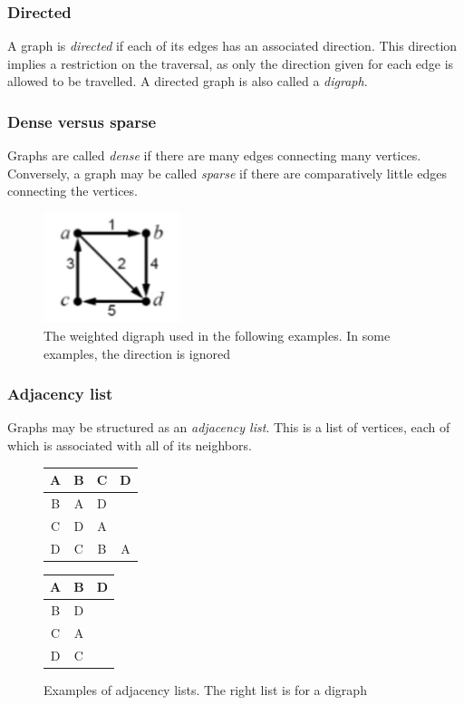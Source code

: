 \documentclass{article}
\begin{document}
{\subsubsection{Directed}
A graph is {\em directed} if each of its edges has an associated direction. This direction implies a restriction
on the traversal, as only the direction given for each edge is allowed to be travelled. A directed graph is also
called a {\em digraph}.

\subsubsection{Dense versus sparse}
Graphs are called {\em dense} if there are many edges connecting many vertices.
Conversely, a graph may be called {\em sparse} if there are comparatively little edges connecting the vertices.

\begin{figure}[H]
  \centering
  \includegraphics[width=4cm]{weighted_directed_graph}
  \caption{The weighted digraph used in the following examples. In some examples, the direction is ignored}
\end{figure}

\subsubsection{Adjacency list}
Graphs may be structured as an {\em adjacency list}. This is a list of vertices, each of which is associated with
all of its neighbors.

\begin{figure}[H]
  \centering
  \begin{tabular}{|c|c c c|}
    \hline
    A  & B & C & D  \\ [0.5ex]
    \hline
    B  & A & D & \  \\
    \hline
    C  & D & A & \  \\
    \hline
    D  & C & B & A  \\
    \hline
  \end{tabular}
  \quad
  \begin{tabular}{|c|c c|}
    \hline
    A  & B & D  \\ [0.5ex]
    \hline
    B  & D & \  \\
    \hline
    C  & A & \  \\
    \hline
    D  & C & \  \\
    \hline
  \end{tabular}
  \caption{Examples of adjacency lists. The right list is for a digraph}
\end{figure}

}
\end{document}
